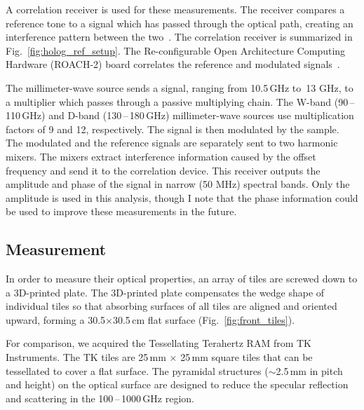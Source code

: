 A correlation receiver is used for these measurements. The receiver compares a reference tone to a signal which has passed through the optical path, creating an interference pattern between the two~\cite{ches18}. The correlation receiver is summarized in Fig.~\ref{fig:holog_ref_setup}.  The Re-configurable Open Architecture Computing Hardware (ROACH-2) board correlates the reference and modulated signals~\cite{roach2}.

The millimeter-wave source sends a signal, ranging from 10.5\,GHz to \,13 GHz, to a multiplier which passes through a passive multiplying chain. The W-band (90\,--\,110\,GHz) and D-band (130\,--\,180\,GHz) millimeter-wave sources use multiplication factors of 9 and 12, respectively. The signal is then modulated by the sample. The modulated and the reference signals are separately sent to two harmonic mixers. The mixers extract interference information caused by the offset frequency and send it to the correlation device. This receiver outputs the amplitude and phase of the signal in narrow (50 MHz) spectral bands.  Only the amplitude is used in this analysis, though I note that the phase information could be used to improve these measurements in the future.

\subsection{Measurement}

In order to measure their optical properties, an array of tiles are screwed down to a 3D-printed plate. The 3D-printed plate compensates the wedge shape of individual tiles so that absorbing surfaces of all tiles are aligned and oriented upward, forming a 30.5$\times$30.5\,cm flat surface (Fig.~\ref{fig:front_tiles}).

For comparison, we acquired the Tessellating Terahertz RAM from TK Instruments.  The TK tiles are 25\,mm $\times$ 25\,mm square tiles that can be tessellated to cover a flat surface. The pyramidal structures ($\sim$2.5\,mm in pitch and height) on the optical surface are designed to reduce the specular reflection and scattering in the 100\,--\,1000\,GHz region. 


